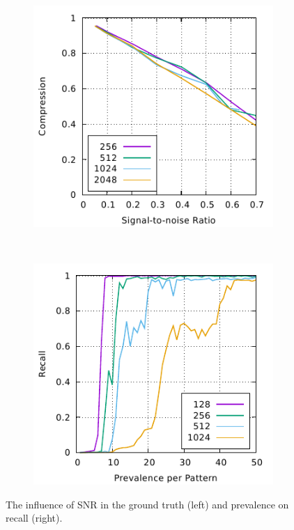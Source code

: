 \documentclass{llncs}
\begin{document}

\begin{figure}[p]%
	\begin{subfigure}[t]{0.5\textwidth}
	\includegraphics[scale=1]{figures/experiments-gnuplottex-fig1.pdf}

	\end{subfigure}%
	~
	\begin{subfigure}[t]{0.5\textwidth}
	\includegraphics[scale=1]{figures/experiments-gnuplottex-fig2.pdf}
	\end{subfigure}
	\caption{The influence of SNR in the ground truth (left) and prevalence on recall (right).} 
	\label{fig:plots}
\end{figure}
\end{document}
